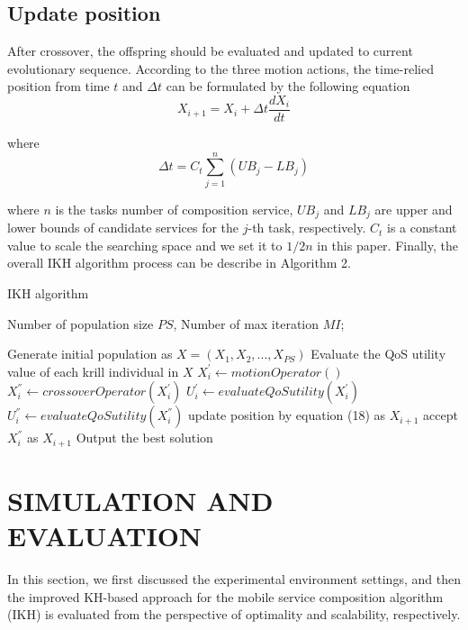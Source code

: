 \documentclass[10pt,journal,compsoc]{IEEEtran}
\begin{document}
\subsection{Update position}
After crossover, the offspring should be evaluated and updated to current evolutionary sequence.
According to the three motion actions, the time-relied position from time $t$ and $\Delta t$ can be formulated by the following equation
\begin{equation}
X_{i+1} = X_i + \Delta t \frac{dX_i}{dt}
\end{equation}

where
\begin{equation}
\Delta t = C_t\sum_{j=1}^{n}(UB_j - LB_j)
\end{equation}

where $n$ is the tasks number of composition service, $UB_j$ and $LB_j$ are upper and lower bounds of candidate services for the $j$-th task, respectively. $C_t$ is a constant value to scale the searching space and we set it to $1/2n$ in this paper. Finally, the overall IKH algorithm process can be describe in Algorithm 2.

\begin{algorithm}
\caption{IKH algorithm}
\label{alg2}
\begin{algorithmic}[1]

\REQUIRE Number of population size $PS$, Number of max iteration $MI$;

\STATE Generate initial population as $X = (X_1, X_2, ..., X_{PS})$
\STATE Evaluate the QoS utility value of each krill individual in $X$
		\STATE $X_i^{'} \leftarrow motionOperator()$
		\STATE $X_i^{''} \leftarrow crossoverOperator(X_i^{'})$
		\STATE $U_i^{'} \leftarrow evaluateQoSutility(X_i^{'})$
		\STATE $U_i^{''} \leftarrow evaluateQoSutility(X_i^{''})$
			\STATE update position by equation (18) as $X_{i+1}$
		\ELSE
			\STATE accept $X_i^{''}$ as $X_{i+1}$
		\ENDIF
	\ENDFOR
\ENDFOR
\STATE Output the best solution
\end{algorithmic}
\end{algorithm}

\section{SIMULATION AND EVALUATION}
In this section, we first discussed the experimental environment settings, and then the improved KH-based approach for the mobile service composition algorithm (IKH) is evaluated from the perspective of optimality and scalability, respectively.
\end{document}
